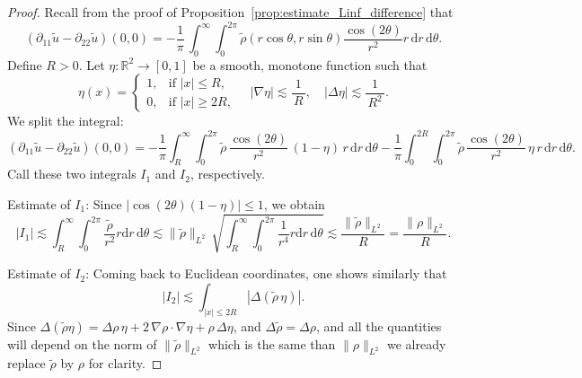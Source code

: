 \documentclass[11pt,a4paper]{article}
\numberwithin{equation}{section}
\theoremstyle{plain}
\theoremstyle{remark}
\newcommand {\f}{\frac}
\begin{document}
\begin{proof}
Recall from the proof of Proposition~\ref{prop:estimate_Linf_difference} that
\[
(\partial_{11}\tilde{u} - \partial_{22}\tilde{u})(0,0)
 = 
-\f{1}{\pi}\,
\int_{0}^{\infty}\!\int_{0}^{2\pi}
\tilde{\rho}(r\cos\theta, r\sin\theta)
 \f{\cos(2\theta)}{r^2} r
\,\mathrm{d}r\,\mathrm{d}\theta.
\]
Define $R>0$. Let $\eta:\mathbb{R}^2\to[0,1]$ be a smooth, monotone function such that
\[
\eta(x)  = 
\begin{cases}
1, & \text{if }|x|\le R,\\
0, & \text{if }|x|\ge 2R,
\end{cases}
\quad
|\nabla\eta| \lesssim \f{1}{\,R\,},
\quad
|\Delta\eta| \lesssim \f{1}{\,R^2\,}.
\]
We split the integral:
\[
(\partial_{11}\tilde{u} - \partial_{22}\tilde{u})(0,0)
 = 
-\f{1}{\pi}
\int_{R}^{\infty}\!\int_{0}^{2\pi}
\tilde{\rho}\,\f{\cos(2\theta)}{r^2}\,(1-\eta)\,r
\,\mathrm{d}r\,\mathrm{d}\theta
 - 
\f{1}{\pi}
\int_{0}^{2R}\!\int_{0}^{2\pi}
\tilde{\rho}\,\f{\cos(2\theta)}{r^2}\,\eta\,r
\,\mathrm{d}r\,\mathrm{d}\theta.
\]
Call these two integrals $I_1$ and $I_2$, respectively.

\medskip

\noindent Estimate of $I_1$:
Since $|\cos(2\theta)(1-\eta)| \le 1$, we obtain
\[
|I_1|
 \lesssim 
\int_{R}^{\infty}\!\!\int_{0}^{2\pi}
\f{\tilde{\rho}}{r^2} r
 \mathrm{d}r\,\mathrm{d}\theta
 \lesssim 
\|\tilde{\rho}\|_{L^2}\,\sqrt{ \int_{R}^{\infty}\!\int_{0}^{2\pi}
\f{1}{r^4} r
 \mathrm{d}r\,\mathrm{d}\theta}
 \lesssim 
\f{\|\tilde{\rho}\|_{L^2}}{\,R\,}
 = 
\f{\|\rho\|_{L^2}}{\,R\,}.
\]

\medskip

\noindent Estimate of $I_2$:
Coming back to Euclidean coordinates, one shows similarly that
\[
|I_2| \lesssim 
\int_{|x|\le 2R}
\!\left|\Delta(\tilde{\rho}\,\eta)\right|.
\]
Since $\Delta(\tilde{\rho}\eta)=\Delta\rho\,\eta+2\,\nabla\rho\cdot\nabla\eta+\rho\,\Delta\eta$, 
and $\Delta\tilde{\rho}=\Delta\rho$, and all the quantities will depend on the norm of $\|\tilde{\rho}\|_{L^2}$ which is the same than $\|\rho\|_{L^2}$ we already replace $\tilde{\rho}$ by $\rho$ for clarity.

\smallskip


\end{proof}
\end{document}
